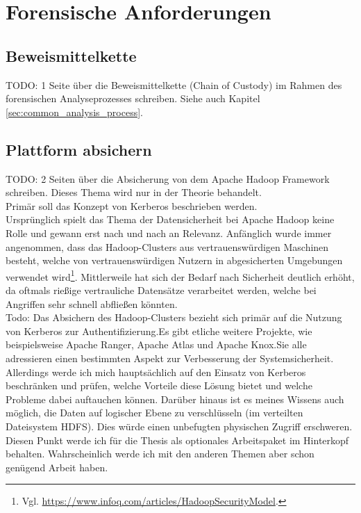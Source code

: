 \chapter{Forensische Anforderungen}
\label{ch:additional_aspects}

\section{Beweismittelkette}
TODO: 1 Seite über die Beweismittelkette (Chain of Custody) im Rahmen des forensischen Analyseprozesses schreiben. Siehe auch Kapitel \ref{sec:common_analysis_process}.

\section{Plattform absichern}
TODO: 2 Seiten über die Absicherung von dem Apache Hadoop Framework schreiben. Dieses Thema wird nur in der Theorie behandelt.\\
Primär soll das Konzept von Kerberos beschrieben werden.\\

\noindent
Ursprünglich spielt das Thema der Datensicherheit bei Apache Hadoop keine Rolle und gewann erst nach und nach an Relevanz. Anfänglich wurde immer angenommen, dass das Hadoop-Clusters aus vertrauenswürdigen Maschinen besteht, welche von vertrauenswürdigen Nutzern in abgesicherten Umgebungen verwendet wird\footnote{Vgl. \url{https://www.infoq.com/articles/HadoopSecurityModel}.}. Mittlerweile hat sich der Bedarf nach Sicherheit deutlich erhöht, da oftmals rießige vertrauliche Datensätze verarbeitet werden, welche bei Angriffen sehr schnell abfließen könnten.\\

\noindent
Todo:
Das Absichern des Hadoop-Clusters bezieht sich primär auf die Nutzung von Kerberos zur Authentifizierung.Es gibt etliche weitere Projekte, wie beispielsweise Apache Ranger, Apache Atlas und Apache Knox.Sie alle adressieren einen bestimmten Aspekt zur Verbesserung der Systemsicherheit. Allerdings werde ich mich hauptsächlich auf den Einsatz von Kerberos beschränken und prüfen, welche Vorteile diese Lösung bietet und welche Probleme dabei auftauchen können. Darüber hinaus ist es meines Wissens auch möglich, die Daten auf logischer Ebene zu verschlüsseln (im verteilten Dateisystem HDFS). Dies würde einen unbefugten physischen Zugriff erschweren. Diesen Punkt werde ich für die Thesis als optionales Arbeitspaket im Hinterkopf behalten. Wahrscheinlich werde ich mit den anderen Themen aber schon genügend Arbeit haben. 
